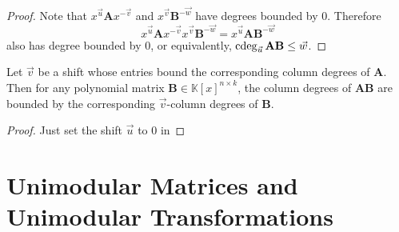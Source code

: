 \begin{proof}
Note that $x^{\vec{u}}\mathbf{A}x^{-\vec{v}}$ and $x^{\vec{v}}\mathbf{B}^{-\vec{w}}$
have degrees bounded by 0. Therefore 
\[
x^{\vec{u}}\mathbf{A}x^{-\vec{v}}x^{\vec{v}}\mathbf{B}^{-\vec{w}}=x^{\vec{u}}\mathbf{A}\mathbf{B}^{-\vec{w}}
\]
 also has degree bounded by 0, or equivalently, $\cdeg_{\vec{u}}\mathbf{A}\mathbf{B}\le\vec{w}$. \end{proof}
\begin{cor}
\label{lem:boundOnDegreesOfFA}Let $\vec{v}$ be a shift whose entries
bound the corresponding column degrees of $\mathbf{A}$. Then for
any polynomial matrix $\mathbf{B}\in\mathbb{K}\left[x\right]^{n\times k}$,
the column degrees of $\mathbf{A}\mathbf{B}$ are bounded %
by the corresponding $\vec{v}$-column degrees of $\mathbf{B}$.\end{cor}
\begin{proof}
Just set the shift $\vec{u}$ to 0 in 
\end{proof}
\begin{comment}
\begin{lem}
\label{lem:productDegreeBoundWithRowDegrees}If the $\vec{u}$-row
degrees of $\mathbf{A}\in\mathbb{K}\left[x\right]^{m\times n}$ are
bounded by the corresponding entries of an integer list $\vec{v}\in\mathbb{Z}^{n}$,
and the $-\vec{u}$-column degrees of $\mathbf{B}\in\mathbb{K}\left[x\right]^{n\times k}$
are bounded by $\vec{w}\in\mathbb{Z}^{k}$, then the $-\vec{v}$-column
degrees of $\mathbf{A}\mathbf{B}$ are bounded by $\vec{w}$. \end{lem}
\begin{proof}
Note that $x^{-\vec{v}}\mathbf{A}x^{\vec{u}}$ and $x^{-\vec{u}}\mathbf{B}^{-\vec{w}}$
have degrees bounded by 0. Therefore, $x^{-\vec{v}}\mathbf{A}x^{\vec{u}}x^{-\vec{u}}\mathbf{B}^{-\vec{w}}=x^{-\vec{v}}\mathbf{A}\mathbf{B}^{-\vec{w}}$
also has degree bounded by 0, or equivalently, $\cdeg_{-\vec{v}}\mathbf{A}\mathbf{B}\le\vec{w}$.
Alternatively, this also follows from the fact $\cdeg_{-\vec{v}}\mathbf{A}\le-\vec{u}$
from \prettyref{lem:productDegreeBound}.\end{proof}
\end{comment}



\section{Unimodular Matrices and Unimodular Transformations}

